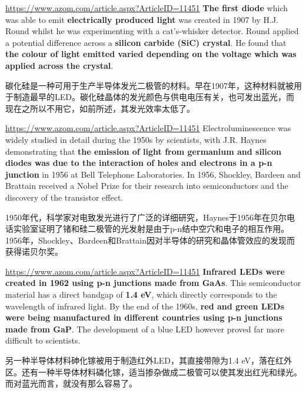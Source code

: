 \documentclass{beamer}
\newenvironment{slide}{
    \begin{frame}{\bfseries{\sectiontitle}}
}{
    \end{frame}
}
\begin{document}
\begin{slide}{\url{https://www.azom.com/article.aspx?ArticleID=11451}}
    \textbf{The first diode} which was able to emit \textbf{electrically produced light} was created in 1907 by H.J. Round whilst he was experimenting with a cat's-whisker detector. Round applied a potential difference across a \textbf{silicon carbide (SiC) crystal}. He found that \textbf{the colour of light emitted varied depending on the voltage which was applied across the crystal}.
    \bigskip

    碳化硅是一种可用于生产半导体发光二极管的材料。早在1907年，这种材料就被用于制造最早的LED。碳化硅晶体的发光颜色与供电电压有关，也可发出蓝光，而现在之所以不用它，如前所述，其发光效率太低了。
\end{slide}

\begin{slide}{\url{https://www.azom.com/article.aspx?ArticleID=11451}}
Electroluminescence was widely studied in detail during the 1950s by scientists, with J.R. Haynes demonstrating that \textbf{the emission of light from germanium and silicon diodes was due to the interaction of holes and electrons in a p-n junction} in 1956 at Bell Telephone Laboratories. In 1956, Shockley, Bardeen and Brattain received a Nobel Prize for their research into semiconductors and the discovery of the transistor effect.
\bigskip

1950年代，科学家对电致发光进行了广泛的详细研究，Haynes于1956年在贝尔电话实验室证明了锗和硅二极管的光发射是由于p-n结中空穴和电子的相互作用。1956年，Shockley、Bardeen和Brattain因对半导体的研究和晶体管效应的发现而获得诺贝尔奖。

\end{slide}

\begin{slide}{\url{https://www.azom.com/article.aspx?ArticleID=11451}}
    \textbf{Infrared LEDs were created in 1962 using p-n junctions made from GaAs}. This semiconductor material has a direct bandgap of \textbf{1.4 eV}, which directly corresponds to the wavelength of infrared light. By the end of the 1960s, \textbf{red and green LEDs were being manufactured in different countries using p-n junctions made from GaP}. The development of a blue LED however proved far more difficult to scientists.
    \bigskip

    另一种半导体材料砷化镓被用于制造红外LED，其直接带隙为1.4 eV，落在红外区。还有一种半导体材料磷化镓，适当掺杂做成二极管可以使其发出红光和绿光。而对蓝光而言，就没有那么容易了。
\end{slide}
\end{document}
